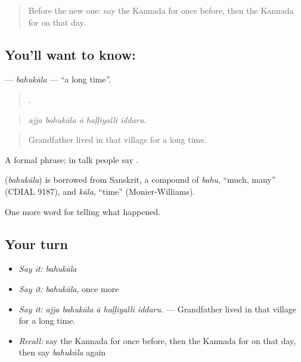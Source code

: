 \label{lesson:KA-C331-bahukala}



\begin{quote}
Before the new one: say the Kannada for once before, then the Kannada for on that day.
\end{quote}

\subsection*{You'll want to know: }
\textbf{} — \emph{bahukāla} — \textquotedblleft{}a long time\textquotedblright{}.

\begin{quote}
    .
\end{quote}

\begin{quote}
\emph{ajja bahukāla ā haḷḷiyalli iddaru.}
\end{quote}

\begin{quote}
Grandfather lived in that village for a long time.
\end{quote}

A formal phrase; in talk people say  .

\begin{cousinweb}
\textbf{} (\emph{bahukāla}) is borrowed from Sanskrit, a compound of \emph{bahu}, \textquotedblleft{}much, many\textquotedblright{} (CDIAL 9187), and \emph{kāla}, \textquotedblleft{}time\textquotedblright{} (Monier-Williams).
\end{cousinweb}

\begin{grammarlens}[title={What you've built}]
One more word for telling what happened.
\end{grammarlens}

\subsection*{Your turn}
\begin{itemize}
\raggedright
  \item \emph{Say it:} \emph{bahukāla}
  \item \emph{Say it:} \emph{bahukāla}, once more
  \item \emph{Say it:} \emph{ajja bahukāla ā haḷḷiyalli iddaru.} — Grandfather lived in that village for a long time.
  \item \emph{Recall:} say the Kannada for once before, then the Kannada for on that day, then say \emph{bahukāla} again
\end{itemize}

